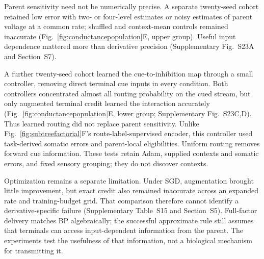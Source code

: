 \documentclass[11pt]{article}
\begin{document}
Parent sensitivity need not be numerically precise. A separate twenty-seed cohort retained low error with two- or four-level estimates or noisy estimates of parent voltage at a common rate; shuffled and context-mean controls remained inaccurate (Fig.~\ref{fig:conductancepopulation}E, upper group). Useful input dependence mattered more than derivative precision (Supplementary Fig.~S23A and Section~S7).

A further twenty-seed cohort learned the cue-to-inhibition map through a small controller, removing direct terminal cue inputs in every condition. Both controllers concentrated almost all routing probability on the cued stream, but only augmented terminal credit learned the interaction accurately (Fig.~\ref{fig:conductancepopulation}E, lower group; Supplementary Fig.~S23C,D). Thus learned routing did not replace parent sensitivity. Unlike Fig.~\ref{fig:subtreefactorial}F's route-label-supervised encoder, this controller used task-derived somatic errors and parent-local eligibilities. Uniform routing removes forward cue information. These tests retain Adam, supplied contexts and somatic errors, and fixed sensory grouping; they do not discover contexts.

Optimization remains a separate limitation. Under SGD, augmentation brought little improvement, but exact credit also remained inaccurate across an expanded rate and training-budget grid. That comparison therefore cannot identify a derivative-specific failure (Supplementary Table~S15 and Section~S5). Full-factor delivery matches BP algebraically; the successful approximate rule still assumes that terminals can access input-dependent information from the parent. The experiments test the usefulness of that information, not a biological mechanism for transmitting it.
\end{document}
